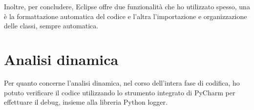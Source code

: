 Inoltre, per concludere, Eclipse offre due funzionalità che ho utilizzato spesso, una è la formattazione automatica del codice e l’altra l’importazione e organizzazione delle classi, sempre automatica.

\section{Analisi dinamica}

Per quanto concerne l’analisi dinamica, nel corso dell’intera fase di codifica, ho potuto verificare il codice utilizzando lo strumento integrato di PyCharm per effettuare il debug, insieme alla libreria Python logger.
